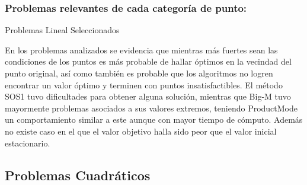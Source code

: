 \subsubsection{Problemas relevantes de cada categoría de punto:}
 

\begin{resultstable}{Problemas Lineal Seleccionados}
    \end{resultstable}
    
En los problemas analizados se evidencia que mientras más fuertes sean las condiciones de los puntos es más probable de hallar óptimos en la vecindad del punto original, 
así como también es probable que los algoritmos no logren encontrar un valor óptimo y terminen con puntos insatisfactibles.
El método SOS1 tuvo dificultades para obtener alguna solución, mientras que Big-M tuvo mayormente problemas asociados a sus valores extremos, teniendo ProductMode un comportamiento similar a este aunque con mayor tiempo de cómputo.
Además no existe caso en el que el valor objetivo halla sido peor que el valor inicial estacionario.
   


\subsection{Problemas Cuadráticos}


    
